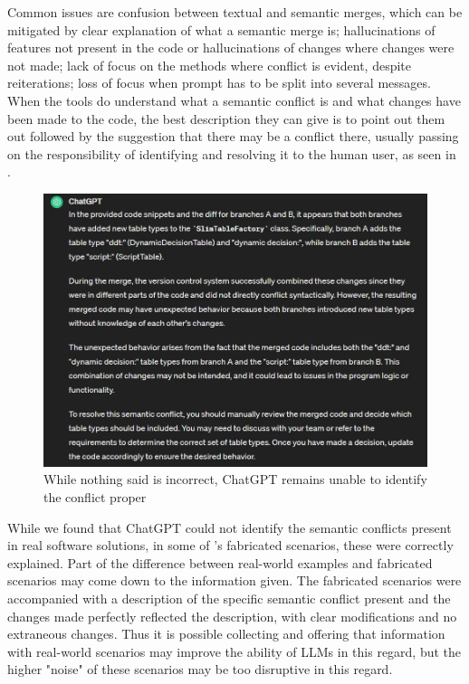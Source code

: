 Common issues are confusion between textual and semantic merges, which can be mitigated by clear explanation of what a semantic merge is; hallucinations of features not present in the code or hallucinations of changes where changes were not made; lack of focus on the methods where conflict is evident, despite reiterations; loss of focus when prompt has to be split into several messages. When the tools do understand what a semantic conflict is and what changes have been made to the code, the best description they can give is to point out them out followed by the suggestion that there may be a conflict there, usually passing on the responsibility of identifying and resolving it to the human user, as seen in .

\begin{figure}
    \centering
    \includegraphics[width=1\linewidth]{figures/almostsemantic.jpg}
    \caption{While nothing said is incorrect, ChatGPT remains unable to identify the conflict proper}
    \label{fig:cantfind}
\end{figure}

While we found that ChatGPT could not identify the semantic conflicts present in real software solutions, in some of \citet{kn:nuno}'s fabricated scenarios, these were correctly explained. Part of the difference between real-world examples and fabricated scenarios may come down to the information given. The fabricated scenarios were accompanied with a description of the specific semantic conflict present and the changes made perfectly reflected the description, with clear modifications and no extraneous changes. Thus it is possible collecting and offering that information with real-world scenarios may improve the ability of LLMs in this regard, but the higher "noise" of these scenarios may be too disruptive in this regard.

